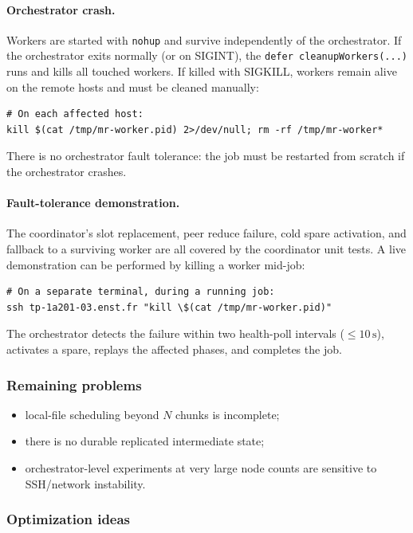 \documentclass[11pt,a4paper]{article}
\begin{document}
\paragraph{Orchestrator crash.}
Workers are started with \texttt{nohup} and survive independently of the
orchestrator. If the orchestrator exits normally (or on SIGINT), the
\texttt{defer cleanupWorkers(...)} runs and kills all touched workers. If
killed with SIGKILL, workers remain alive on the remote hosts and must be
cleaned manually:
\begin{lstlisting}[style=codeblock]
# On each affected host:
kill $(cat /tmp/mr-worker.pid) 2>/dev/null; rm -rf /tmp/mr-worker*
\end{lstlisting}
There is no orchestrator fault tolerance: the job must be restarted from
scratch if the orchestrator crashes.

\paragraph{Fault-tolerance demonstration.}
The coordinator's slot replacement, peer reduce failure, cold spare activation,
and fallback to a surviving worker are all covered by the coordinator unit
tests. A live demonstration can be performed by killing a worker mid-job:
\begin{lstlisting}[style=codeblock]
# On a separate terminal, during a running job:
ssh tp-1a201-03.enst.fr "kill \$(cat /tmp/mr-worker.pid)"
\end{lstlisting}
The orchestrator detects the failure within two health-poll intervals
(\(\leq 10\,\text{s}\)), activates a spare, replays the affected phases, and
completes the job.

\subsubsection{Remaining problems}
\begin{itemize}[leftmargin=1.5em]
  \item local-file scheduling beyond \(N\) chunks is incomplete;
  \item there is no durable replicated intermediate state;
  \item orchestrator-level experiments at very large node counts are sensitive to
  SSH/network instability.
\end{itemize}

\subsubsection{Optimization ideas}
\end{document}
